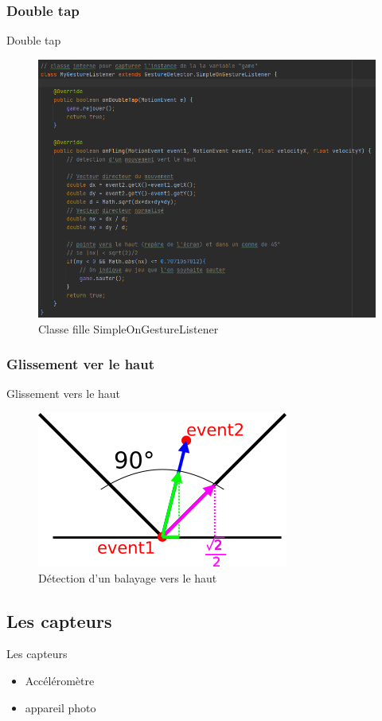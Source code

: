 \documentclass[t,12pt]{beamer}
\begin{document}
\subsubsection{Double tap}
\begin{frame}{Double tap}

\begin{figure}
    \centering
    \includegraphics[width=0.75\linewidth]{images/gesture.png}
    \caption{Classe fille SimpleOnGestureListener}
\end{figure}

    
\end{frame}

\subsubsection{Glissement ver le haut}
\begin{frame}{Glissement vers le haut}

\begin{figure}
    \centering
    \includegraphics{images/swipe_up.png}
    \caption{Détection d'un balayage vers le haut}
\end{figure}
\end{frame}

\subsection{Les capteurs}
\begin{frame}{Les capteurs}
    \begin{itemize}
        \item Accéléromètre
        \item appareil photo
    \end{itemize}
\end{frame}
\end{document}
